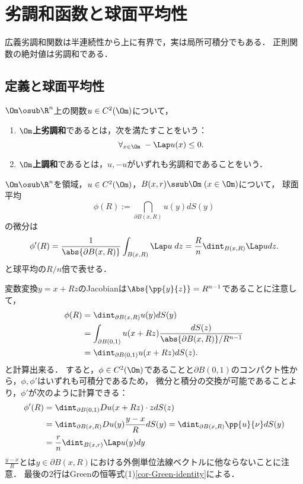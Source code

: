 \documentclass[uplatex,dvipdfmx]{jsreport}
\begin{document}
\section{劣調和函数と球面平均性}

\begin{tcolorbox}[colframe=ForestGreen, colback=ForestGreen!10!white,breakable,colbacktitle=ForestGreen!40!white,coltitle=black,fonttitle=\bfseries\sffamily,
title=]
    広義劣調和関数は半連続性から上に有界で，実は局所可積分でもある．
    正則関数の絶対値は劣調和である．
\end{tcolorbox}

\subsection{定義と球面平均性}

\begin{definition}
    $\Om\osub\R^n$上の関数$u\in C^2(\Om)$について，
    \begin{enumerate}
        \item \textbf{$\Om$上劣調和}であるとは，次を満たすことをいう：
        \[\forall_{x\in\Om}\;-\Lap u(x)\le 0.\]
        \item \textbf{$\Om$上調和}であるとは，$u,-u$がいずれも劣調和であることをいう．
    \end{enumerate}
\end{definition}

\begin{lemma}[球面平均の微分の表示]\label{lemma-derivative-of-surface-avarage-of-arbitrary-function}
    $\Om\osub\R^n$を領域，$u\in C^2(\Om)$，$B(x,r)\ssub\Om\;(x\in\Om)$について，
    球面平均
    \[\phi(R):=\dint_{\partial B(x,R)}u(y)dS(y)\]
    の微分は
    \[\phi'(R)=\frac{1}{\abs{\partial B(x,R)}}\int_{B(x,R)}\Lap u\;dz=\frac{R}{n}\dint_{B(x,R)}\Lap udz.\]
    と球平均の$R/n$倍で表せる．
\end{lemma}
\begin{Proof}
    変数変換$y=x+Rz$のJacobianは$\Abs{\pp{y}{z}}=R^{n-1}$であることに注意して，
    \begin{align*}
        \phi(R)&=\dint_{\partial B(x,R)}u(y)dS(y)\\
        &=\int_{\partial B(0,1)}u(x+Rz)\frac{dS(z)}{\abs{\partial B(x,R)}/R^{n-1}}\\
        &=\dint_{\partial B(0,1)}u(x+Rz)dS(z).
    \end{align*}
    と計算出来る．
    すると，$\phi\in C^2(\Om)$であることと$\partial B(0,1)$のコンパクト性から，$\phi,\phi'$はいずれも可積分であるため，
    微分と積分の交換が可能であることより，$\phi'$が次のように計算できる：
    \begin{align*}
        \phi'(R)&=\dint_{\partial B(0,1)}Du(x+Rz)\cdot zdS(z)\\
        &=\dint_{\partial B(x,R)}Du(y)\frac{y-x}{R}dS(y)=\dint_{\partial B(x,R)}\pp{u}{\nu}dS(y)\\
        &=\frac{r}{n}\dint_{B(x,r)}\Lap u(y)dy
    \end{align*}
    $\frac{y-x}{R}$とは$y\in\partial B(x,R)$における外側単位法線ベクトルに他ならないことに注意．
    最後の2行はGreenの恒等式(1)\ref{cor-Green-identity}による．
\end{Proof}
\end{document}
